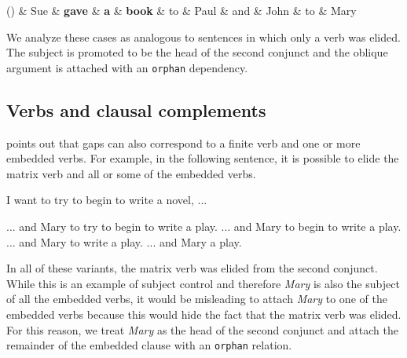 \documentclass[11pt]{article}
\newenvironment{myquote}%
  {\list{}{\leftmargin=0.0in\rightmargin=0.0in}\item[]}%
  {\endlist}
\newcounter{excounter}
\begin{document}
\begin{myquote}
  \label{ex:en-gap-4}
  \footnotesize
  \begin{dependency}[edge unit distance=2.5ex]
    \begin{deptext}[column sep=0.085cm]
      (\theexcounter) \& Sue \& \textbf{gave} \& \textbf{a} \& \textbf{book} \& to \& Paul \& and \& John \& to \& Mary \\
    \end{deptext}
  \end{dependency}
\end{myquote}
We analyze these cases as analogous to sentences in which only a verb was elided. 
The subject is promoted to be the head of the second conjunct and the oblique 
argument is attached with an \texttt{orphan} dependency.

\subsection{Verbs and clausal complements}

 points out that gaps can also correspond to a finite
verb and one or more embedded verbs. For example, in the following 
sentence, it is possible to elide the matrix verb and all or some of the embedded verbs. 
\begin{exe}
  \footnotesize
  \setcounter{xnumi}{\value{excounter}}
  \ex \label{ex:non-fin-embedded}
  I want to try to begin to write a novel, ...
  \begin{xlist}
    \ex ... and Mary to try to begin to write a play.
    \ex ... and Mary to begin to write a play.
    \ex ... and Mary to write a play.
    \ex ... and Mary a play. \hfill {}
  \end{xlist}
\end{exe}
In all of these variants, the matrix verb was elided from the second conjunct. 
While this is an example of subject control and therefore \textit{Mary} is also the 
subject of all the embedded verbs, it would be misleading to attach \textit{Mary} to 
one of the embedded verbs because this would hide the fact that the matrix verb 
was elided. For this reason, we treat \textit{Mary} as the head of the second conjunct 
and attach the remainder of the embedded clause with an \texttt{orphan} relation.
\end{document}
